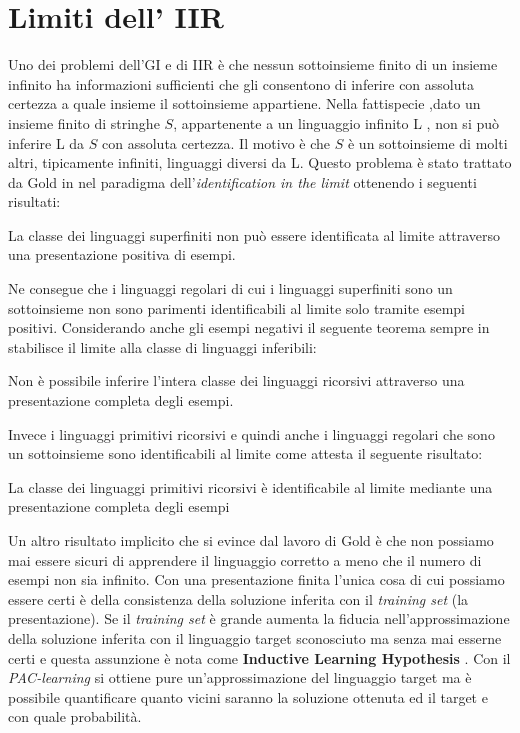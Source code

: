 \section{Limiti dell' IIR}
\label{sec:limIIR}
Uno dei problemi dell'\ac{GI} e di \ac{IIR} è che nessun sottoinsieme finito di un insieme infinito ha informazioni sufficienti che gli consentono di inferire con assoluta certezza a quale insieme il sottoinsieme appartiene. Nella fattispecie ,dato un insieme finito di stringhe $S$,  appartenente a un linguaggio infinito \ac{L} , non si può inferire \ac{L} da $S$ con assoluta certezza. Il motivo è che $S$ è un sottoinsieme di molti altri, tipicamente infiniti, linguaggi diversi da \ac{L}. Questo problema è stato trattato da Gold in \cite{Gold67} nel paradigma dell'\textit{identification in the limit} ottenendo i seguenti risultati:
\begin{teorema}
La classe dei linguaggi superfiniti non può essere identificata al limite attraverso una presentazione positiva di esempi.
\end{teorema}
Ne consegue che i linguaggi regolari di cui i linguaggi superfiniti sono un sottoinsieme non sono parimenti identificabili al limite solo tramite esempi positivi. Considerando anche gli esempi negativi il seguente teorema sempre in  \cite{Gold67}  stabilisce il limite alla classe di linguaggi inferibili:
\begin{teorema}
Non è possibile inferire l'intera classe dei linguaggi ricorsivi attraverso una presentazione completa degli esempi.
\end{teorema}
Invece i linguaggi primitivi ricorsivi e quindi anche i linguaggi regolari che sono un sottoinsieme sono identificabili al limite come attesta il seguente risultato:
\begin{teorema}
La classe dei linguaggi primitivi ricorsivi è identificabile al limite mediante una presentazione completa degli esempi
\end{teorema}

Un altro risultato implicito che si evince dal lavoro di Gold è che non possiamo mai essere sicuri di apprendere il linguaggio corretto a meno che il numero di esempi non sia infinito. Con una presentazione finita l'unica cosa di cui possiamo essere certi è della consistenza della soluzione inferita con il \textit{training set} (la presentazione). Se il \textit{training set}  è grande aumenta la fiducia nell'approssimazione della soluzione inferita con il linguaggio target sconosciuto ma senza mai esserne certi e questa assunzione è nota come \textbf{Inductive Learning Hypothesis} \cite{Abela02}. Con il \textit{PAC-learning} si ottiene pure un'approssimazione del linguaggio target ma è possibile quantificare quanto vicini saranno la soluzione ottenuta ed il target e con quale probabilità.\\

